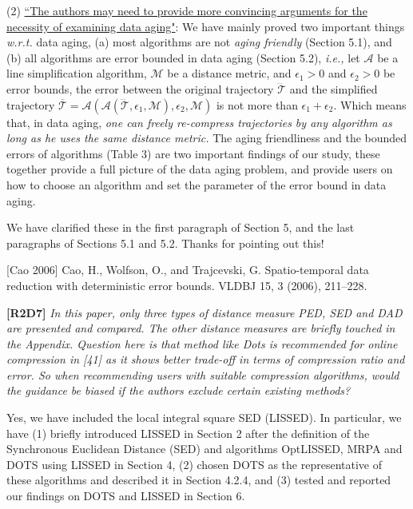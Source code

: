 \documentclass{letter}
\newcommand{\ie}{\emph{i.e.,}\xspace}
\newcommand{\wrt}{\emph{w.r.t.}\xspace}
\begin{document}
(2) \underline{``The authors may need to provide more convincing arguments for the necessity of examining data aging"}: We have mainly proved two important things \wrt data aging, (a) most algorithms are not \emph{aging friendly} (Section 5.1), and (b) all algorithms are error bounded in data aging (Section 5.2), \ie let $\mathcal{A}$ be a line simplification algorithm,  $\mathcal{M}$ be a distance metric, and $\epsilon_1>0$ and $\epsilon_2>0$ be error bounds, the error between the original trajectory $\dddot{\mathcal{T}}$ and the simplified trajectory $\overline{\mathcal{T}}=\mathcal{A}(\mathcal{A}(\dddot{\mathcal{T}}, \epsilon_1, \mathcal{M}), \epsilon_2, \mathcal{M})$ is not more than $\epsilon_1+ \epsilon_2$. Which means that, in data aging, \emph{one can freely re-compress trajectories by any algorithm as long as he uses the same distance metric.} The aging friendliness and the bounded errors of algorithms (Table 3) are two important findings of our study, these together provide a full picture of the data aging problem, and provide users on how to choose an algorithm and set the parameter of the error bound in data aging.

We have clarified these in the first paragraph of Section 5, and the last paragraphs of Sections 5.1 and 5.2. Thanks for pointing out this!

[Cao 2006] Cao, H., Wolfson, O., and Trajcevski, G. Spatio-temporal data reduction with deterministic error bounds. VLDBJ 15, 3 (2006), 211--228.


\textbf{[R2D7]} \emph{In this paper, only three types of distance measure PED, SED and DAD are presented and compared. The other distance measures are briefly touched in the Appendix. Question here is that method like Dots is recommended for online compression in [41] as it shows better trade-off in terms of compression ratio and error. So when recommending users with suitable compression algorithms, would the guidance be biased if the authors exclude certain existing methods?}

Yes, we have included the local integral square SED (LISSED). %
In particular, we have (1) briefly introduced LISSED in Section 2 after the definition of the Synchronous Euclidean Distance (SED) and algorithms OptLISSED, MRPA and DOTS using LISSED in Section 4,   (2) chosen DOTS as the representative of these algorithms and described it in Section 4.2.4, and (3) tested and reported our findings on DOTS and LISSED in Section 6.
\end{document}
